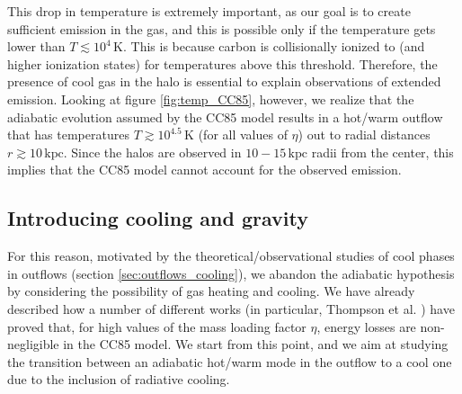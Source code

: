 This drop in temperature is extremely important, as our goal is to create sufficient \CII emission in the gas, and this is possible only if the temperature gets lower than $T\lesssim10^4\,\mathrm{K}$. This is because carbon is collisionally ionized to \CIIIion (and higher ionization states) for temperatures above this threshold. Therefore, the presence of cool gas in the halo is essential to explain observations of \CII extended emission. Looking at figure \ref{fig:temp_CC85}, however, we realize that the adiabatic evolution assumed by the CC85 model results in a hot/warm outflow that has temperatures $T\gtrsim10^{4.5}\,\mathrm{K}$ (for all values of $\eta$) out to radial distances $r\gtrsim10\,\mathrm{kpc}$. Since the halos are observed in $10-15\,\mathrm{kpc}$ radii from the center, this implies that the CC85 model cannot account for the observed \CII emission. 

\subsection{Introducing cooling and gravity} \label{sec:cooling_gravity}



%

For this reason, motivated by the theoretical/observational studies of cool phases in outflows (section \ref{sec:outflows_cooling}), we abandon the adiabatic hypothesis by considering the possibility of gas heating and cooling. We have already described how a number of different works (in particular, Thompson et al. \citep{Thompson16}) have proved that, for high values of the mass loading factor $\eta$, energy losses are non-negligible in the CC85 model. We start from this point, and we aim at studying the transition between an adiabatic hot/warm mode in the outflow to a cool one due to the inclusion of radiative cooling.

